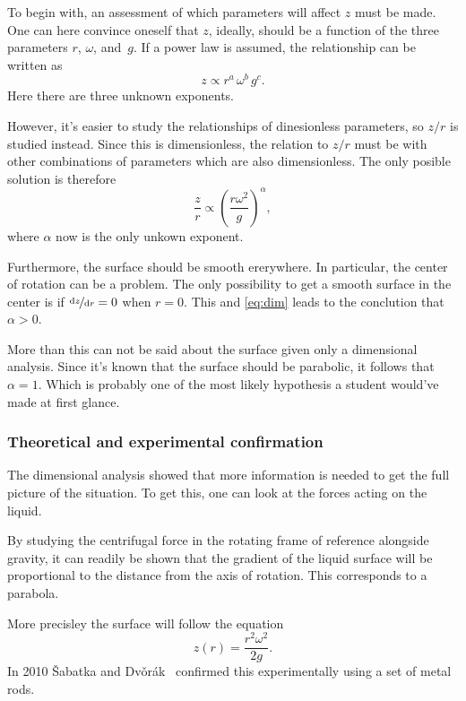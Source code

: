 \documentclass[11pt,towcolumn, swedish, english]{article}
\begin{document}
To begin with, an assessment of which parameters will affect $z$ must
be made. One can here convince oneself that $z$, ideally, should be a
function of the three parameters $r$, $\omega$, and~$g$. If a power
law is assumed, the relationship can be written as
\begin{equation}
z\propto r^a\, \omega^b\, g^c.
\end{equation}
Here there are three unknown exponents.

However, it's easier to study the relationships of dinesionless
parameters, so $z/r$ is studied instead. Since this is dimensionless,
the relation to $z/r$ must be with other combinations of parameters
which are also dimensionless. The only posible solution is therefore
\begin{equation}\label{eq:dim}
\frac{z}{r} \propto \left(\frac{r\omega^2}{g}\right)^\alpha, 
\end{equation}
where $\alpha$ now is the only unkown exponent.

Furthermore, the surface should be smooth ererywhere. In particular,
the center of rotation can be a problem. The only possibility to get a
smooth surface in the center is if $\nicefrac{\mathrm{d}{z}}{\mathrm{d}{r}}=0$ when
$r=0$. This and \eqref{eq:dim} leads to the conclution that $\alpha>0$.

More than this can not be said about the surface given only a
dimensional analysis. Since it's known that the surface should be
parabolic, it follows that $\alpha=1$. 
Which is probably one of the most likely hypothesis a student would've
made at first glance.  

\subsubsection{Theoretical and experimental confirmation}
The dimensional analysis showed that more information is needed to get
the full picture of the situation. To get this, one can look at the
forces acting on the liquid.

By studying the centrifugal force in the rotating frame of reference
alongside gravity, it can readily be shown that the gradient of the
liquid surface will be proportional to the distance from the axis of
rotation. This corresponds to a parabola. 

More precisley the surface will follow the
equation~\cite{Sabatka2010, Berg1990} 
\begin{equation}\label{eq:parabola}
z(r)=\frac{r^2\omega^2}{2g}.
\end{equation}
In 2010 \v{S}abatka and
Dv\v{o}rák~\cite{Sabatka2010} confirmed this experimentally using a
set of metal rods. 
\end{document}
